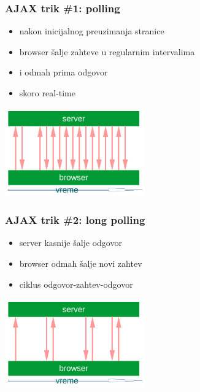 \documentclass[compress]{beamer}
\begin{document}
\begin{frame}
  \frametitle{AJAX trik \#1: polling}
  \begin{itemize}
    \item nakon inicijalnog preuzimanja stranice
    \item browser šalje zahteve u regularnim intervalima
    \item i odmah prima odgovor
    \item skoro real-time
  \end{itemize}
  \begin{center}
    \includegraphics[width=6cm]{polling.pdf}
  \end{center}
\end{frame}

\begin{frame}
  \frametitle{AJAX trik \#2: long polling}
  \begin{itemize}
    \item server kasnije šalje odgovor
    \item browser odmah šalje novi zahtev
    \item ciklus odgovor-zahtev-odgovor
  \end{itemize}
  \begin{center}
    \includegraphics[width=6cm]{long-polling.pdf}
  \end{center}
\end{frame}
\end{document}
